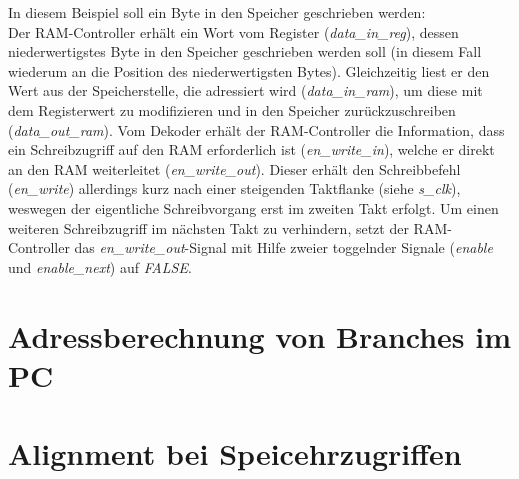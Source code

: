 In diesem Beispiel soll ein Byte in den Speicher geschrieben werden:\\
Der RAM-Controller erhält ein Wort vom Register (\textit{data\_in\_reg}), dessen niederwertigstes Byte in den Speicher geschrieben werden soll (in diesem Fall wiederum an die Position des niederwertigsten Bytes).
Gleichzeitig liest er den Wert aus der Speicherstelle, die adressiert wird  (\textit{data\_in\_ram}), um diese mit dem Registerwert zu modifizieren und in den Speicher zurückzuschreiben (\textit{data\_out\_ram}).
Vom Dekoder erhält der RAM-Controller die Information, dass ein Schreibzugriff auf den RAM erforderlich ist (\textit{en\_write\_in}), welche er direkt an den RAM weiterleitet (\textit{en\_write\_out}).
Dieser erhält den Schreibbefehl (\textit{en\_write}) allerdings kurz nach einer steigenden Taktflanke (siehe \textit{s\_clk}), weswegen der eigentliche Schreibvorgang erst im zweiten Takt erfolgt.
Um einen weiteren Schreibzugriff im nächsten Takt zu verhindern, setzt der RAM-Controller das \textit{en\_write\_out}-Signal  mit Hilfe zweier toggelnder Signale (\textit{enable} und \textit{enable\_next}) auf \textit{FALSE}.
\section{Adressberechnung von Branches im PC}
\section{Alignment bei Speicehrzugriffen}

